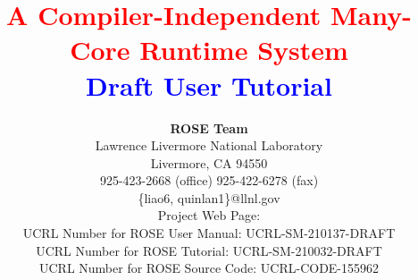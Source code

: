 \documentclass[10pt]{article}
\begin{document}

\title{ {\bf \textcolor{red}{A Compiler-Independent Many-Core Runtime System} \\ 
              \textcolor{blue}{Draft User Tutorial} \\
              } }
\author{ {\bf ROSE Team} \\
         Lawrence Livermore National Laboratory \\ 
         Livermore, CA  94550 \\
         925-423-2668 (office)  925-422-6278 (fax) \\
         \{liao6, quinlan1\}@llnl.gov \\
         Project Web Page:
          \\
         UCRL Number for ROSE User Manual: UCRL-SM-210137-DRAFT \\
         UCRL Number for ROSE Tutorial: UCRL-SM-210032-DRAFT \\
         UCRL Number for ROSE Source Code: UCRL-CODE-155962 \\ \\
          \\
          \\
       }
\maketitle
\newpage


\setcounter{tocdepth}{2}

\tableofcontents
\newpage
%





\listoffixmes
\end{document}
